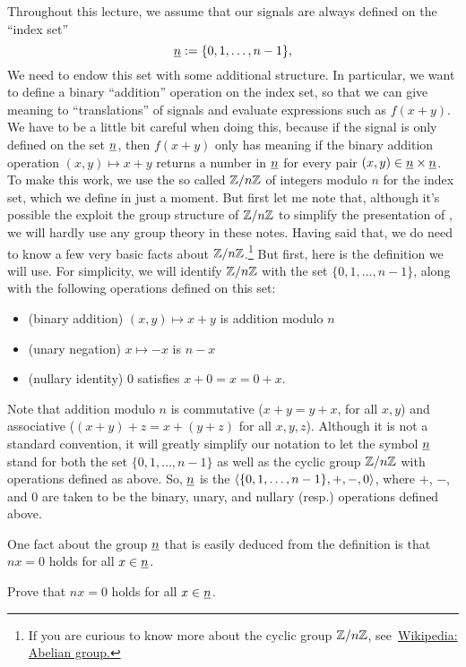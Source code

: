 Throughout this lecture, we assume that our signals are always defined on the
``index set'' 
\[
\underline{n} := \{0, 1, \dots, n-1\},
\]
We need to endow this set with
some additional structure.   
In particular, we want to define a binary ``addition'' operation on the 
index set, so that we can give meaning to ``translations'' of signals
and evaluate expressions such as $f(x+y)$.
 We have to be a little bit careful
when doing this, because if the signal is only defined on 
the set $\underline{n}$, then $f(x+y)$ only has meaning if the 
binary addition operation $(x,y) \mapsto x+y$ returns a number in $\underline{n}$
for every pair $(x, y) \in \underline{n} \times \underline{n}$. 
To make this work, we use the so called  $\mathbb Z/n\mathbb Z$ of
integers modulo $n$ for the index set, which we define in just a moment.  
But first let me note that, although it's possible the exploit the group
structure of $\mathbb Z/n\mathbb Z$ to simplify the presentation of \dsp, 
we will hardly use any group theory in these notes.
Having said that, we do need to know a few very basic facts about
$\mathbb Z/n\mathbb Z$.\footnote{If you are curious to know more about the cyclic group 
  $\mathbb Z/n\mathbb Z$, see~\href{https://en.wikipedia.org/wiki/Abelian_group}{Wikipedia:
    Abelian group.}   
}
But first, here is the definition we will use.  
For simplicity, we will identify $\mathbb Z/n\mathbb Z$ with the set
$\{0, 1, \dots, n-1\}$, along with the following operations defined on this set:
\begin{itemize}
\item (binary addition) $(x,y) \mapsto x+y$ is addition modulo $n$
\item (unary negation) $x\mapsto -x$ is $n-x$
\item (nullary identity) $0$ satisfies $x+0 = x = 0+x$.
\end{itemize}
Note that addition modulo $n$ is commutative ($x+y = y+x$, for all $x,y$) 
and associative ($(x+y)+z = x+(y+z)$ for all $x,y,z$). 
Although it is not a standard convention, it will greatly simplify our notation 
to let the symbol $\underline{n}$ stand for both the set 
$\{0, 1, \dots, n-1\}$ as well as the cyclic group $\mathbb Z/n\mathbb Z$ with
operations defined as above.  So, $\underline{n}$ is the 
$\langle\{0,1,\dots, n-1\}, +, -, 0\rangle$, where $+$, $-$, and $0$ are taken to be the
binary, unary, and nullary (resp.) operations defined above. 

One fact about the group $\underline{n}$ that
is easily deduced from the definition is that $nx = 0$
holds for all $x \in \underline{n}$.
\begin{exercise}
\label{exer:nx}
  Prove that $nx = 0$ holds for all $x \in \underline{n}$.
\end{exercise}

